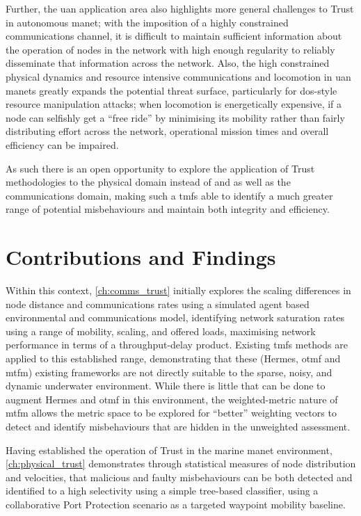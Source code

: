 Further, the \gls{uan} application area also highlights more general challenges to Trust in autonomous \gls{manet}; with the imposition of a highly constrained communications channel, it is difficult to maintain sufficient information about the operation of nodes in the network with high enough regularity to reliably disseminate that information across the network.
Also, the high constrained physical dynamics and resource intensive communications and locomotion in \gls{uan} \glspl{manet} greatly expands the potential threat surface, particularly for \gls{dos}-style resource manipulation attacks; when locomotion is energetically expensive, if a node can selfishly get a ``free ride'' by minimising its mobility rather than fairly distributing effort across the network, operational mission times and overall efficiency can be impaired. 

As such there is an open opportunity to explore the application of Trust methodologies to the physical domain instead of and as well as the communications domain, making such a \glspl{tmf} able to identify a much greater range of potential misbehaviours and maintain both integrity and efficiency.


\section{Contributions and Findings}

Within this context, \autoref{ch:comms_trust} initially explores the scaling differences in node distance and communications rates using a simulated agent based environmental and communications model, identifying network saturation rates using a range of mobility, scaling, and offered loads, maximising network performance in terms of a throughput-delay product.
Existing \glspl{tmf} methods are applied to this established range, demonstrating that these (Hermes, \gls{otmf} and \gls{mtfm}) existing frameworks are not directly suitable to the sparse, noisy, and dynamic underwater environment.
While there is little that can be done to augment Hermes and \gls{otmf} in this environment, the weighted-metric nature of \gls{mtfm} allows the metric space to be explored for ``better'' weighting vectors to detect and identify misbehaviours that are hidden in the unweighted assessment.

Having established the operation of Trust in the marine \gls{manet} environment, \autoref{ch:physical_trust} demonstrates through statistical measures of node distribution and velocities, that malicious and faulty misbehaviours can be both detected and identified to a high selectivity using a simple tree-based classifier, using a collaborative Port Protection scenario as a targeted waypoint mobility baseline.

